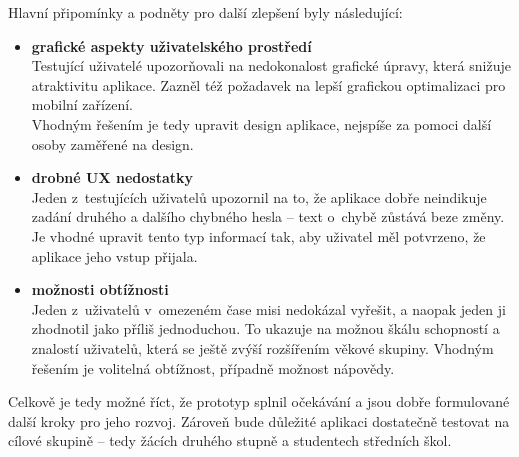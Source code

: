 Hlavní připomínky a podněty pro další zlepšení byly následující:

\begin{itemize}
	\item \textbf{grafické aspekty uživatelského prostředí}\\
	Testující uživatelé upozorňovali na nedokonalost grafické úpravy, která snižuje atraktivitu aplikace.
	Zazněl též požadavek na lepší grafickou optimalizaci pro mobilní zařízení.\\  
	Vhodným řešením je tedy upravit design aplikace, nejspíše za pomoci další osoby zaměřené na design.
	\item \textbf{drobné UX nedostatky}\\
	Jeden z~testujících uživatelů upozornil na to, že aplikace dobře neindikuje zadání druhého a dalšího chybného hesla -- text o~chybě zůstává beze změny.\\
	Je vhodné upravit tento typ informací tak, aby uživatel měl potvrzeno, že aplikace jeho vstup přijala.\\
	\item \textbf{možnosti obtížnosti}\\
	Jeden z~uživatelů v~omezeném čase misi nedokázal vyřešit, a naopak jeden ji zhodnotil jako příliš jednoduchou. To ukazuje na možnou škálu schopností a znalostí uživatelů, která se ještě zvýší rozšířením věkové skupiny.
	Vhodným řešením je volitelná obtížnost, případně možnost nápovědy.
\end{itemize}

Celkově je tedy možné říct, že prototyp splnil očekávání a jsou dobře formulované další kroky pro jeho rozvoj.
Zároveň bude důležité aplikaci dostatečně testovat na cílové skupině -- tedy žácích druhého stupně a studentech středních škol.   